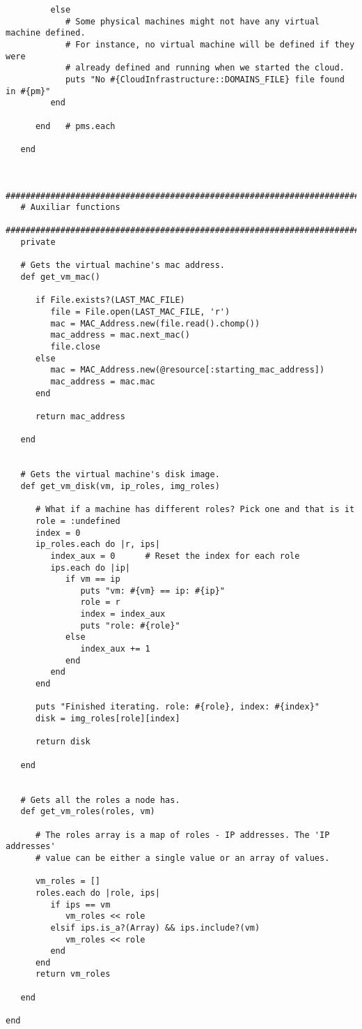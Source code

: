 \begin{lstlisting}
         else
            # Some physical machines might not have any virtual machine defined.
            # For instance, no virtual machine will be defined if they were
            # already defined and running when we started the cloud.
            puts "No #{CloudInfrastructure::DOMAINS_FILE} file found in #{pm}"
         end
         
      end   # pms.each

   end


   #############################################################################
   # Auxiliar functions
   #############################################################################
   private

   # Gets the virtual machine's mac address.
   def get_vm_mac()
      
      if File.exists?(LAST_MAC_FILE)
         file = File.open(LAST_MAC_FILE, 'r')
         mac = MAC_Address.new(file.read().chomp())
         mac_address = mac.next_mac()
         file.close
      else
         mac = MAC_Address.new(@resource[:starting_mac_address])
         mac_address = mac.mac
      end
      
      return mac_address

   end


   # Gets the virtual machine's disk image.
   def get_vm_disk(vm, ip_roles, img_roles)
      
      # What if a machine has different roles? Pick one and that is it
      role = :undefined
      index = 0
      ip_roles.each do |r, ips|
         index_aux = 0      # Reset the index for each role
         ips.each do |ip|
            if vm == ip
               puts "vm: #{vm} == ip: #{ip}"
               role = r
               index = index_aux
               puts "role: #{role}"
            else
               index_aux += 1
            end
         end
      end
      
      puts "Finished iterating. role: #{role}, index: #{index}"
      disk = img_roles[role][index]
      
      return disk

   end


   # Gets all the roles a node has.
   def get_vm_roles(roles, vm)

      # The roles array is a map of roles - IP addresses. The 'IP addresses'
      # value can be either a single value or an array of values.
      
      vm_roles = []
      roles.each do |role, ips|
         if ips == vm
            vm_roles << role
         elsif ips.is_a?(Array) && ips.include?(vm)
            vm_roles << role
         end
      end
      return vm_roles

   end

end
\end{lstlisting}


